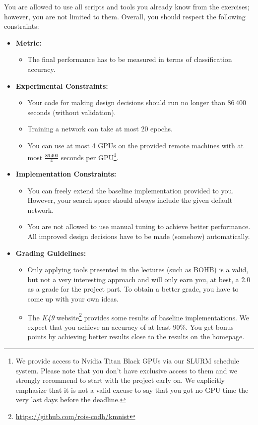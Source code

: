 \documentclass[10pt,a4paper]{article}
\begin{document}
		\noindent		
		You are allowed to use all scripts and tools you already know from the exercises; however, you are not limited to them.
		Overall, you should respect the following constraints:
		\begin{itemize}
			\item \textbf{Metric:}
			\begin{itemize}
				\item The final performance has to be measured in terms of classification accuracy.\\
			\end{itemize}
			\item \textbf{Experimental Constraints:}
			\begin{itemize}
				\item Your code for making design decisions should run no longer than $86\,400$ seconds (without validation).
				\item Training a network can take at most 20 epochs.
				\item You can use at most 4 GPUs on the provided remote machines with at most $\frac{86\,400}{4}$ seconds per GPU\footnote{We provide access to Nvidia Titan Black GPUs via our SLURM schedule system. Please note that you don't have exclusive access to them and we strongly recommend to start with the project early on. We explicitly emphasize that it is not a valid excuse to say that you got no GPU time the very last days before the deadline.}.
			\end{itemize}
			\item \textbf{Implementation Constraints:}
			\begin{itemize}
			  \item You can freely extend the baseline implementation provided to you. However, your search space should always include the given default network.
			  \item You are not allowed to use manual tuning to achieve better performance. All improved design decisions have to be made (somehow) automatically.
			\end{itemize}
			\item \textbf{Grading Guidelines:}
			\begin{itemize}
			  \item Only applying tools presented in the lectures (such as BOHB) is a valid, but not a very interesting approach and will only earn you, at best, a 2.0 as a grade for the project part. To obtain a better grade, you have to come up with your own ideas.
			  \item The \textit{K49} website\footnote{\url{https://github.com/rois-codh/kmnist}} provides some results of baseline implementations. We expect that you achieve an accuracy of at least $90\%$. You get bonus points by achieving better results close to the results on the homepage.
			\end{itemize}
		\end{itemize}
		
\end{document}

